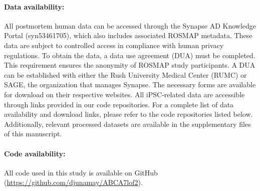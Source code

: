 \documentclass[12pt]{article}
\begin{document}
\paragraph{Data availability:} All postmortem human data can be accessed through the Synapse AD Knowledge Portal (syn53461705), which also includes associated ROSMAP metadata. These data are subject to controlled access in compliance with human privacy regulations. To obtain the data, a data use agreement (DUA) must be completed. This requirement ensures the anonymity of ROSMAP study participants. A DUA can be established with either the Rush University Medical Center (RUMC) or SAGE, the organization that manages Synapse. The necessary forms are available for download on their respective websites. All iPSC-related data are accessible through links provided in our code repositories. For a complete list of data availability and download links, please refer to the code repositories listed below. Additionally, relevant processed datasets are available in the supplementary files of this manuscript.


\paragraph{Code availability:} All code used in this study is available on GitHub (\url{https://github.com/djunamay/ABCA7lof2}). \clearpage


\nolinenumbers
\end{document}
